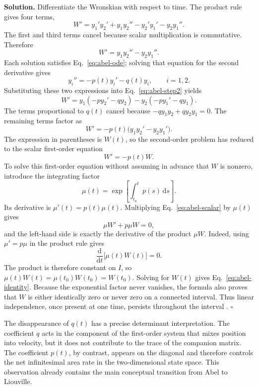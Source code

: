 \documentclass[11pt,a4paper]{article}
\newcommand{\be}{\begin{equation}}
\newcommand{\ee}{\end{equation}}
\newcommand{\lb}[1]{\label{#1}}
\newcommand{\dd}{\mathrm{d}}
\theoremstyle{definition}
\newenvironment{solution}
{\par\noindent\textbf{Solution.}}
{\hfill$\square$\par}
\numberwithin{equation}{section}
\begin{document}
\begin{solution}
Differentiate the Wronskian with respect to time. The product rule gives four terms,
\be
W'
=
y_1'y_2'+y_1y_2''-y_2'y_1'-y_2y_1''.
\lb{eq:abel-step1}
\ee
The first and third terms cancel because scalar multiplication is commutative. Therefore
\be
W'=y_1y_2''-y_2y_1''.
\lb{eq:abel-step2}
\ee
Each solution satisfies Eq.~\eqref{eq:abel-ode}; solving that equation for the second derivative gives
\be
y_i''=-p(t)y_i'-q(t)y_i,
\qquad i=1,2.
\lb{eq:abel-second}
\ee
Substituting these two expressions into Eq.~\eqref{eq:abel-step2} yields
\be
W'
=
y_1(-py_2'-qy_2)-y_2(-py_1'-qy_1).
\lb{eq:abel-step3}
\ee
The terms proportional to $q(t)$ cancel because $-qy_1y_2+qy_2y_1=0$. The remaining terms factor as
\be
W'=-p(t)\bigl(y_1y_2'-y_2y_1'\bigr).
\lb{eq:abel-step4}
\ee
The expression in parentheses is $W(t)$, so the second-order problem has reduced to the scalar first-order equation
\be
W'=-p(t)W.
\lb{eq:abel-scalar}
\ee
To solve this first-order equation without assuming in advance that $W$ is nonzero, introduce the integrating factor
\begin{equation}
\mu(t)=\exp\left[\int_{t_0}^{t}p(s)\,\dd s\right].
\end{equation}
Its derivative is $\mu'(t)=p(t)\mu(t)$. Multiplying Eq.~\eqref{eq:abel-scalar} by $\mu(t)$ gives
\begin{equation}
\mu W'+p\mu W=0,
\end{equation}
and the left-hand side is exactly the derivative of the product $\mu W$. Indeed, using $\mu'=p\mu$ in the product rule gives
\begin{equation}
\frac{\dd}{\dd t}\bigl[\mu(t)W(t)\bigr]=0.
\end{equation}
The product is therefore constant on $I$, so $\mu(t)W(t)=\mu(t_0)W(t_0)=W(t_0)$. Solving for $W(t)$ gives Eq.~\eqref{eq:abel-identity}. Because the exponential factor never vanishes, the formula also proves that $W$ is either identically zero or never zero on a connected interval. Thus linear independence, once present at one time, persists throughout the interval \cite{coddington1955,hartman2002,teschl2012}.
\end{solution}

The disappearance of $q(t)$ has a precise determinant interpretation. The coefficient $q$ acts in the component of the first-order system that mixes position into velocity, but it does not contribute to the trace of the companion matrix. The coefficient $p(t)$, by contrast, appears on the diagonal and therefore controls the net infinitesimal area rate in the two-dimensional state space. This observation already contains the main conceptual transition from Abel to Liouville.
\end{document}
